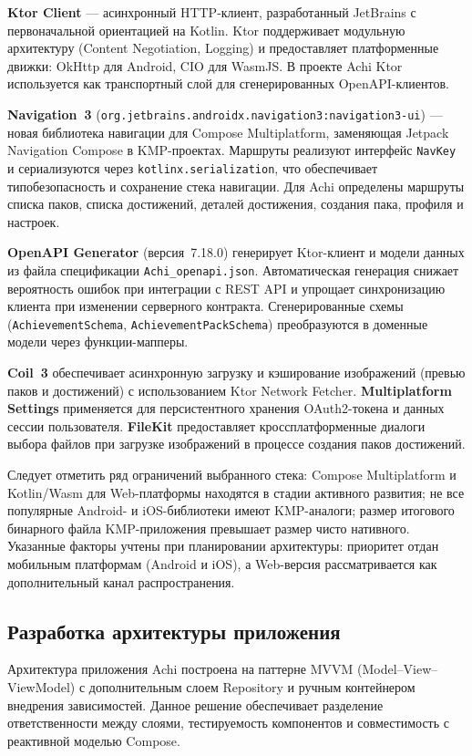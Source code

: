 \documentclass[../main.tex]{subfiles}
\begin{document}
\textbf{Ktor Client} --- асинхронный HTTP-клиент, разработанный JetBrains с первоначальной ориентацией на Kotlin. Ktor поддерживает модульную архитектуру (Content Negotiation, Logging) и предоставляет платформенные движки: OkHttp для Android, CIO для WasmJS. В проекте Achi Ktor используется как транспортный слой для сгенерированных OpenAPI-клиентов.

\textbf{Navigation~3} (\texttt{org.jetbrains.androidx.navigation3:navigation3-ui}) --- новая библиотека навигации для Compose Multiplatform, заменяющая Jetpack Navigation Compose в KMP-проектах. Маршруты реализуют интерфейс \texttt{NavKey} и сериализуются через \texttt{kotlinx.serialization}, что обеспечивает типобезопасность и сохранение стека навигации. Для Achi определены маршруты списка паков, списка достижений, деталей достижения, создания пака, профиля и настроек.

\textbf{OpenAPI Generator} (версия~7.18.0) генерирует Ktor-клиент и модели данных из файла спецификации \texttt{Achi\_openapi.json}. Автоматическая генерация снижает вероятность ошибок при интеграции с REST API и упрощает синхронизацию клиента при изменении серверного контракта. Сгенерированные схемы (\texttt{AchievementSchema}, \texttt{AchievementPackSchema}) преобразуются в доменные модели через функции-мапперы.

\textbf{Coil~3} обеспечивает асинхронную загрузку и кэширование изображений (превью паков и достижений) с использованием Ktor Network Fetcher. \textbf{Multiplatform Settings} применяется для персистентного хранения OAuth2-токена и данных сессии пользователя. \textbf{FileKit} предоставляет кроссплатформенные диалоги выбора файлов при загрузке изображений в процессе создания паков достижений.

Следует отметить ряд ограничений выбранного стека: Compose Multiplatform и Kotlin/Wasm для Web-платформы находятся в стадии активного развития; не все популярные Android- и iOS-библиотеки имеют KMP-аналоги; размер итогового бинарного файла KMP-приложения превышает размер чисто нативного. Указанные факторы учтены при планировании архитектуры: приоритет отдан мобильным платформам (Android и iOS), а Web-версия рассматривается как дополнительный канал распространения.

\subsection{Разработка архитектуры приложения}

Архитектура приложения Achi построена на паттерне MVVM (Model--View--ViewModel) с дополнительным слоем Repository и ручным контейнером внедрения зависимостей. Данное решение обеспечивает разделение ответственности между слоями, тестируемость компонентов и совместимость с реактивной моделью Compose.
\end{document}
